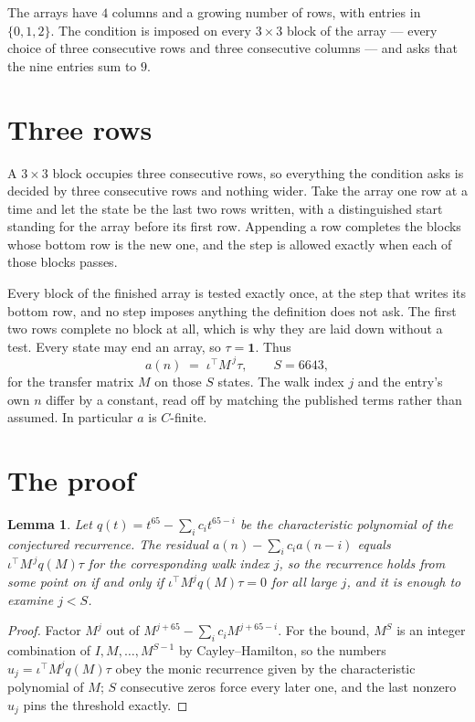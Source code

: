 \documentclass[11pt,a4paper]{article}
\theoremstyle{plain}
\newtheorem{lemma}[theorem]{Lemma}
\theoremstyle{definition}
\begin{document}
The arrays have $4$ columns and a growing number of rows, with entries in $\{0,1,2\}$. The
condition is imposed on every $3\times3$ block of the array --- every choice of three
consecutive rows and three consecutive columns --- and asks that the nine entries sum to $9$.



\section{Three rows}

A $3\times3$ block occupies three consecutive rows, so everything the condition asks is decided
by three consecutive rows and nothing wider. Take the array one row at a time and let the state
be the last two rows written, with a distinguished start standing for the array before its
first row. Appending a row completes the blocks whose bottom row is the new one, and the step
is allowed exactly when each of those blocks passes.

Every block of the finished array is tested exactly once, at the step that writes its bottom
row, and no step imposes anything the definition does not ask. The first two rows complete no
block at all, which is why they are laid down without a test. Every state may end an array, so
$\tau=\mathbf{1}$. Thus
\[
a(n)\;=\;\iota^{\!\top}M^{\,j}\tau ,\qquad S=6643,
\]
for the transfer matrix $M$ on those $S$ states. The walk index $j$ and the entry's own $n$
differ by a constant, read off by matching the published terms rather than assumed. In
particular $a$ is $C$-finite.

\section{The proof}

\begin{lemma}\label{lem:crit}
Let $q(t)=t^{65}-\sum_i c_it^{65-i}$ be the characteristic polynomial of the
conjectured recurrence. The residual $a(n)-\sum_ic_ia(n-i)$ equals
$\iota^{\!\top}M^{\,j}q(M)\tau$ for the corresponding walk index $j$, so the recurrence
holds from some point on if and only if $\iota^{\!\top}M^{j}q(M)\tau=0$ for all large $j$,
and it is enough to examine $j<S$.
\end{lemma}

\begin{proof}
Factor $M^{j}$ out of $M^{j+65}-\sum_ic_iM^{j+65-i}$. For the bound, $M^{S}$
is an integer combination of $I,M,\dots,M^{S-1}$ by Cayley--Hamilton, so the numbers
$u_j=\iota^{\!\top}M^{j}q(M)\tau$ obey the monic recurrence given by the characteristic
polynomial of $M$; $S$ consecutive zeros force every later one, and the last nonzero $u_j$
pins the threshold exactly.
\end{proof}
\end{document}
